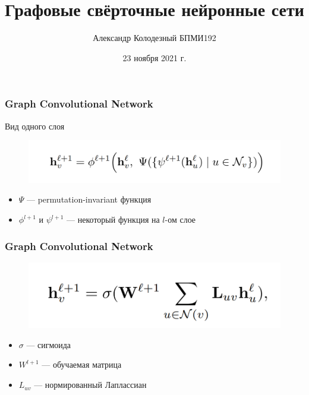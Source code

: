 \documentclass{beamer}
\title[Заголовок]{Графовые свёрточные нейронные сети}
\author[Александр Колодезный]{Александр Колодезный БПМИ192}
\institute[Высшая школа экономики]{Национальный исследовательский университет \\ «Высшая школа экономики» (Москва)}
\date{23 ноября 2021 г.}
\begin{document}

\frame[plain]{\titlepage}	%

\begin{frame}
\frametitle{Graph Convolutional Network}
Вид одного слоя
\begin{figure}
	\includegraphics[width=\columnwidth]{fromula1.png}
\end{figure}
\begin{itemize}
	\item $\Psi$ --- permutation-invariant функция
	\item $\phi^{l + 1}$ и $\psi^{l + 1}$ --- некоторый функция на $l$-ом слое
\end{itemize}
\end{frame}

\begin{frame}
\frametitle{Graph Convolutional Network}
\begin{figure}
	\includegraphics[width=0.8\columnwidth]{formula2.png}
\end{figure}
\begin{itemize}
	\item $\sigma$ --- сигмоида
	\item $W^{l + 1}$ --- обучаемая матрица
	\item $L_{uv}$ --- нормированный Лаплассиан
\end{itemize}
\end{frame}
\end{document}
